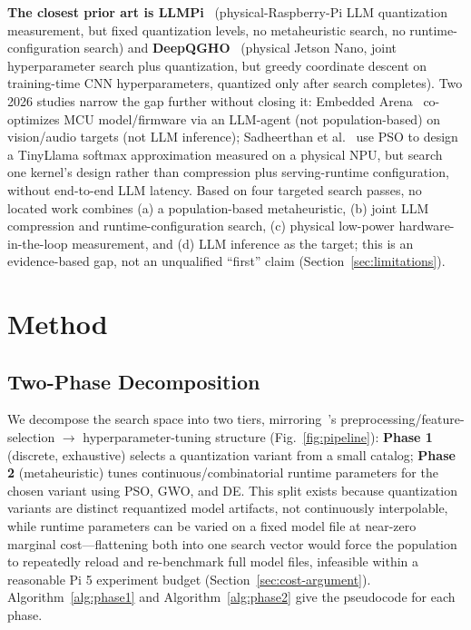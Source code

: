 \documentclass[conference, letterpaper]{IEEEtran}
\begin{document}
\textbf{The closest prior art is LLMPi}~\cite{ref19} (physical-Raspberry-Pi LLM quantization measurement, but fixed quantization levels, no metaheuristic search, no runtime-configuration search) and \textbf{DeepQGHO}~\cite{ref20} (physical Jetson Nano, joint hyperparameter search plus quantization, but greedy coordinate descent on training-time CNN hyperparameters, quantized only after search completes). Two 2026 studies narrow the gap further without closing it: Embedded Arena~\cite{ref21} co-optimizes MCU model/firmware via an LLM-agent (not population-based) on vision/audio targets (not LLM inference); Sadheerthan et al.~\cite{ref22} use PSO to design a TinyLlama softmax approximation measured on a physical NPU, but search one kernel's design rather than compression plus serving-runtime configuration, without end-to-end LLM latency. Based on four targeted search passes, no located work combines (a) a population-based metaheuristic, (b) joint LLM compression and runtime-configuration search, (c) physical low-power hardware-in-the-loop measurement, and (d) LLM inference as the target; this is an evidence-based gap, not an unqualified ``first'' claim (Section~\ref{sec:limitations}).

\section{Method}
\label{sec:method}

\subsection{Two-Phase Decomposition}
We decompose the search space into two tiers, mirroring~\cite{ref11}'s preprocessing/feature-selection $\rightarrow$ hyperparameter-tuning structure (Fig.~\ref{fig:pipeline}): \textbf{Phase 1} (discrete, exhaustive) selects a quantization variant from a small catalog; \textbf{Phase 2} (metaheuristic) tunes continuous/combinatorial runtime parameters for the chosen variant using PSO, GWO, and DE. This split exists because quantization variants are distinct requantized model artifacts, not continuously interpolable, while runtime parameters can be varied on a fixed model file at near-zero marginal cost---flattening both into one search vector would force the population to repeatedly reload and re-benchmark full model files, infeasible within a reasonable Pi 5 experiment budget (Section~\ref{sec:cost-argument}). Algorithm~\ref{alg:phase1} and Algorithm~\ref{alg:phase2} give the pseudocode for each phase.
\end{document}
